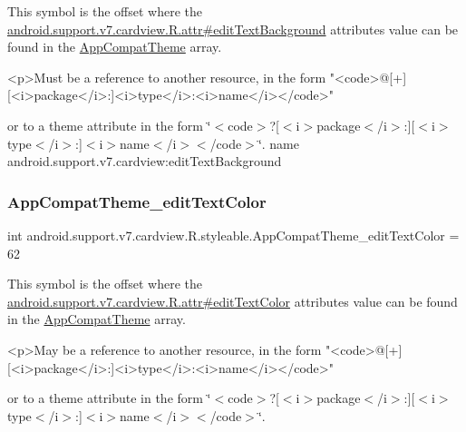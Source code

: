 This symbol is the offset where the \hyperlink{classandroid_1_1support_1_1v7_1_1cardview_1_1R_1_1attr_a2a236b6fb939f8b88f2240c34a13b959}{android.\+support.\+v7.\+cardview.\+R.\+attr\#edit\+Text\+Background} attribute\textquotesingle{}s value can be found in the \hyperlink{classandroid_1_1support_1_1v7_1_1cardview_1_1R_1_1styleable_a52e6f69f954ecc2622d72c0b4d298938}{App\+Compat\+Theme} array.

\begin{DoxyVerb}      <p>Must be a reference to another resource, in the form "<code>@[+][<i>package</i>:]<i>type</i>:<i>name</i></code>"
\end{DoxyVerb}
 or to a theme attribute in the form \char`\"{}$<$code$>$?\mbox{[}$<$i$>$package$<$/i$>$\+:\mbox{]}\mbox{[}$<$i$>$type$<$/i$>$\+:\mbox{]}$<$i$>$name$<$/i$>$$<$/code$>$\char`\"{}.  name android.\+support.\+v7.\+cardview\+:edit\+Text\+Background \mbox{\label{classandroid_1_1support_1_1v7_1_1cardview_1_1R_1_1styleable_ac460822fecf040d46fdef2df0935686e}} 
\subsubsection{\texorpdfstring{App\+Compat\+Theme\+\_\+edit\+Text\+Color}{AppCompatTheme\_editTextColor}}
{\footnotesize\ttfamily int android.\+support.\+v7.\+cardview.\+R.\+styleable.\+App\+Compat\+Theme\+\_\+edit\+Text\+Color = 62\hspace{0.3cm}{\ttfamily [static]}}

This symbol is the offset where the \hyperlink{classandroid_1_1support_1_1v7_1_1cardview_1_1R_1_1attr_a59b88e30dbbfcf1116c696f3515f01ad}{android.\+support.\+v7.\+cardview.\+R.\+attr\#edit\+Text\+Color} attribute\textquotesingle{}s value can be found in the \hyperlink{classandroid_1_1support_1_1v7_1_1cardview_1_1R_1_1styleable_a52e6f69f954ecc2622d72c0b4d298938}{App\+Compat\+Theme} array.

\begin{DoxyVerb}      <p>May be a reference to another resource, in the form "<code>@[+][<i>package</i>:]<i>type</i>:<i>name</i></code>"
\end{DoxyVerb}
 or to a theme attribute in the form \char`\"{}$<$code$>$?\mbox{[}$<$i$>$package$<$/i$>$\+:\mbox{]}\mbox{[}$<$i$>$type$<$/i$>$\+:\mbox{]}$<$i$>$name$<$/i$>$$<$/code$>$\char`\"{}. 

